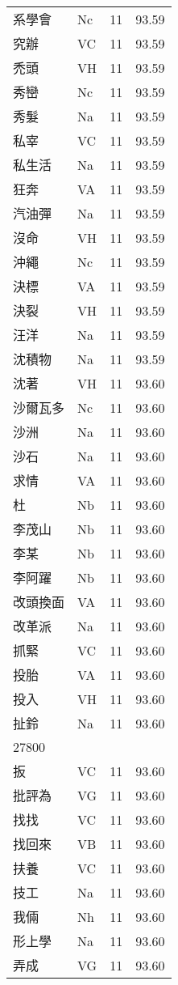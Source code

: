 \documentclass[twocolumn]{book}
\begin{document}
\begin{supertabular}{llrr}
系學會 & Nc & 11 &  93.59\\
究辦 & VC & 11 &  93.59\\
禿頭 & VH & 11 &  93.59\\
秀巒 & Nc & 11 &  93.59\\
秀髮 & Na & 11 &  93.59\\
私宰 & VC & 11 &  93.59\\
私生活 & Na & 11 &  93.59\\
狂奔 & VA & 11 &  93.59\\
汽油彈 & Na & 11 &  93.59\\
沒命 & VH & 11 &  93.59\\
沖繩 & Nc & 11 &  93.59\\
決標 & VA & 11 &  93.59\\
決裂 & VH & 11 &  93.59\\
汪洋 & Na & 11 &  93.59\\
沈積物 & Na & 11 &  93.59\\
沈著 & VH & 11 &  93.60\\
沙爾瓦多 & Nc & 11 &  93.60\\
沙洲 & Na & 11 &  93.60\\
沙石 & Na & 11 &  93.60\\
求情 & VA & 11 &  93.60\\
杜 & Nb & 11 &  93.60\\
李茂山 & Nb & 11 &  93.60\\
李某 & Nb & 11 &  93.60\\
李阿躍 & Nb & 11 &  93.60\\
改頭換面 & VA & 11 &  93.60\\
改革派 & Na & 11 &  93.60\\
抓緊 & VC & 11 &  93.60\\
投胎 & VA & 11 &  93.60\\
投入 & VH & 11 &  93.60\\
扯鈴 & Na & 11 &  93.60\\
27800\\
扳 & VC & 11 &  93.60\\
批評為 & VG & 11 &  93.60\\
找找 & VC & 11 &  93.60\\
找回來 & VB & 11 &  93.60\\
扶養 & VC & 11 &  93.60\\
技工 & Na & 11 &  93.60\\
我倆 & Nh & 11 &  93.60\\
形上學 & Na & 11 &  93.60\\
弄成 & VG & 11 &  93.60\\

\end{supertabular}
\end{document}
